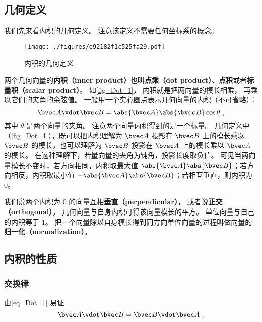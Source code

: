 

\subsection{几何定义}
我们先来看内积的几何定义。 注意该定义不需要任何坐标系的概念。
\begin{figure}[th]
\centering
\texttt{[image: ./figures/e92182f1c525fa29.pdf]}
\caption{内积的几何定义}\label{fig_Dot_1}
\end{figure}

两个几何向量的\textbf{内积（inner product）}也叫\textbf{点乘（dot product）}、\textbf{点积}或者\textbf{标量积（scalar product）}。 如\autoref{fig_Dot_1}， 内积就是把两向量的模长相乘， 再乘以它们的夹角的余弦值。 一般用一个实心圆点表示几何向量的内积（不可省略）：
\begin{equation}\label{eq_Dot_1}
\bvec A \vdot \bvec B = \abs{\bvec A} \abs{\bvec B} \cos\theta ~,
\end{equation}
其中 $\theta$ 是两个向量的夹角。 注意两个向量内积得到的是一个标量。 几何定义中（\autoref{fig_Dot_1}），既可以把内积理解为 $\bvec A$ 投影在 $\bvec B$ 上的模长乘以 $\bvec B$ 的模长，也可以理解为 $\bvec B$ 投影在 $\bvec A$ 上的模长乘以 $\bvec A$ 的模长。 在这种理解下，若量向量的夹角为钝角，投影长度取负值。 可见当两向量模长不变时，若方向相同，内积取最大值 $\abs{\bvec A}\abs{\bvec B}$；若方向相反，内积取最小值 $-\abs{\bvec A}\abs{\bvec B}$；若相互垂直，则内积为 0。

我们说两个内积为 0 的向量互相\textbf{垂直（perpendicular）}， 或者说\textbf{正交（orthogonal）}。 几何向量与自身内积可得该向量模长的平方。 单位向量与自己的内积等于 1。 把一个向量除以自身模长得到同方向单位向量的过程叫做向量的\textbf{归一化（normalization）}。

\subsection{内积的性质}

\subsubsection{交换律}
由\autoref{eq_Dot_1} 易证
\begin{equation}\label{eq_Dot_2}
\bvec A \vdot \bvec B = \bvec B \vdot \bvec A~.
\end{equation}

